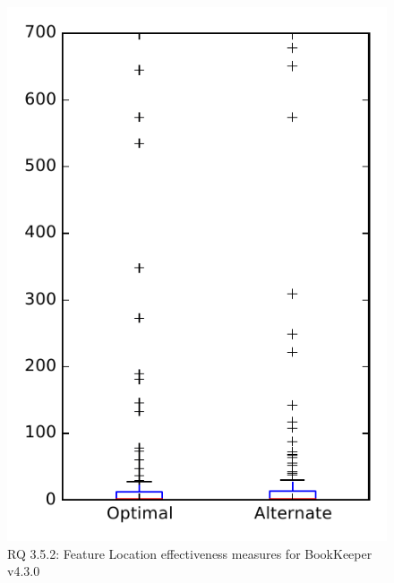 
\begin{figure}
\centering
\includegraphics[height=0.4\textheight]{figures/combo/flt_rq2_bookkeeper}
\caption{RQ 3.5.2: Feature Location effectiveness measures for BookKeeper v4.3.0}
\label{fig:flt:rq2:bookkeeper}
\end{figure}
